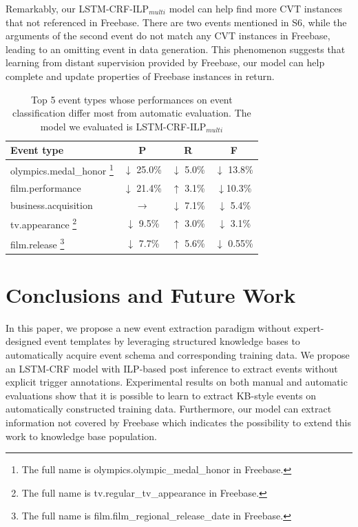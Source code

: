 \documentclass{article}
\begin{document}
Remarkably, our LSTM-CRF-ILP$_{multi}$ model can help find more CVT instances that not referenced in Freebase. There are two events mentioned in S6, while the arguments of the second event do not match any CVT instances in Freebase, leading to an omitting event in data generation. This phenomenon suggests that learning from distant supervision provided by Freebase, our model can help complete and update properties of Freebase instances in return.

\begin{table}[h]
\small
\centering
\begin{tabular}{|l|c|c|c|} \hline
	Event type & P & R & F \\ \hline
	olympics.medal\_honor
	 \footnote{The full name is olympics.olympic\_medal\_honor in Freebase.}
	& $\downarrow$ 25.0\% & $\downarrow$ 5.0\% & $\downarrow$ 13.8\% \\ \hline
	film.performance & $\downarrow$ 21.4\% & $\uparrow$ 3.1\% & $\downarrow$10.3\% \\ \hline
	business.acquisition & $\rightarrow$ & $\downarrow$ 7.1\% & $\downarrow$ 5.4\% \\ \hline
	tv.appearance
	 \footnote{The full name is tv.regular\_tv\_appearance in Freebase.}
	& $\downarrow$ 9.5\% & $\uparrow$ 3.0\% & $\downarrow$ 3.1\% \\ \hline
	film.release
	 \footnote{The full name is film.film\_regional\_release\_date in Freebase.}
	& $\downarrow$ 7.7\% & $\uparrow$ 5.6\% & $\downarrow$ 0.55\% \\ \hline
\end{tabular}
\caption{Top 5 event types whose performances on event classification differ most from automatic evaluation. The model we evaluated is LSTM-CRF-ILP$_{multi}$ \label{tab:4}}
\end{table}



\section{Conclusions and Future Work}
In this paper, we propose a new event extraction paradigm without expert-designed event templates by leveraging structured knowledge bases to automatically acquire event schema and corresponding training data. We propose an LSTM-CRF model with ILP-based post inference to extract events without explicit trigger annotations. Experimental results on both manual and automatic evaluations show that it is possible to learn to extract KB-style events on automatically constructed training data.
Furthermore, our model can extract information not covered by Freebase which indicates the possibility to extend this work to knowledge base population.




\end{document}
